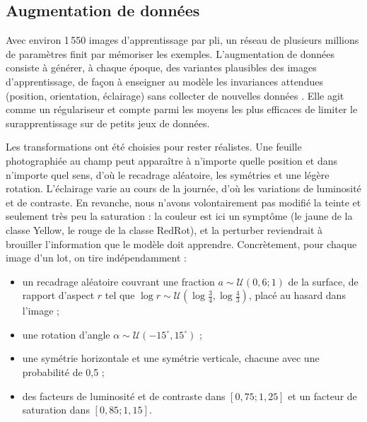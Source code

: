 \subsection{Augmentation de données}
\label{sec:augmentation}

Avec environ 1\,550 images d'apprentissage par pli, un réseau de plusieurs millions de paramètres finit par mémoriser les exemples. L'augmentation de données consiste à générer, à chaque époque, des variantes plausibles des images d'apprentissage, de façon à enseigner au modèle les invariances attendues (position, orientation, éclairage) sans collecter de nouvelles données \cite{shorten2019survey, perez2017effectiveness}. Elle agit comme un régulariseur et compte parmi les moyens les plus efficaces de limiter le surapprentissage sur de petits jeux de données.

Les transformations ont été choisies pour rester réalistes. Une feuille photographiée au champ peut apparaître à n'importe quelle position et dans n'importe quel sens, d'où le recadrage aléatoire, les symétries et une légère rotation. L'éclairage varie au cours de la journée, d'où les variations de luminosité et de contraste. En revanche, nous n'avons volontairement pas modifié la teinte et seulement très peu la saturation : la couleur est ici un symptôme (le jaune de la classe Yellow, le rouge de la classe RedRot), et la perturber reviendrait à brouiller l'information que le modèle doit apprendre. Concrètement, pour chaque image d'un lot, on tire indépendamment :
\begin{itemize}
  \item un recadrage aléatoire couvrant une fraction $a \sim \mathcal{U}(0{,}6 ; 1)$ de la surface, de rapport d'aspect $r$ tel que $\log r \sim \mathcal{U}(\log\tfrac{3}{4}, \log\tfrac{4}{3})$, placé au hasard dans l'image ;
  \item une rotation d'angle $\alpha \sim \mathcal{U}(-15^\circ, 15^\circ)$ ;
  \item une symétrie horizontale et une symétrie verticale, chacune avec une probabilité de 0,5 ;
  \item des facteurs de luminosité et de contraste dans $[0{,}75 ; 1{,}25]$ et un facteur de saturation dans $[0{,}85 ; 1{,}15]$.
\end{itemize}

